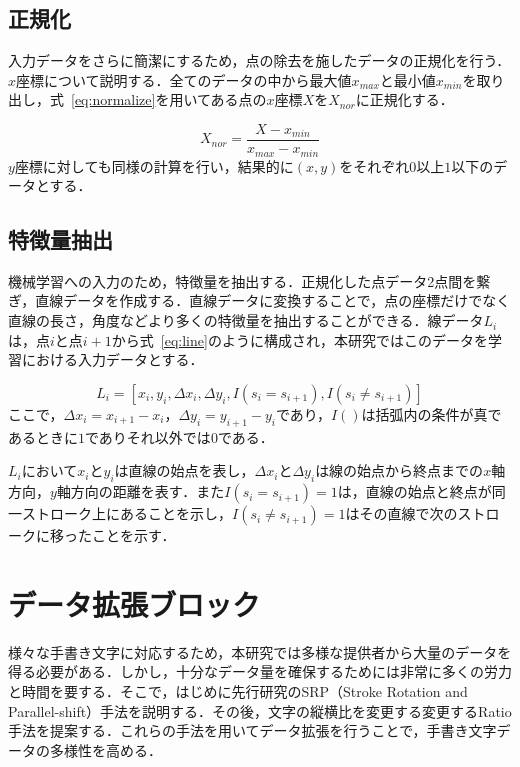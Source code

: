 \subsection{正規化}
\label{normal}
入力データをさらに簡潔にするため，点の除去を施したデータの正規化を行う．
$x$座標について説明する．全てのデータの中から最大値$x_{max}$と最小値$x_{min}$を取り出し，式~\ref{eq:normalize}を用いてある点の$x$座標$X$を$X_{nor}$に正規化する．

\begin{equation}
  X_{nor} = \frac{X - x_{min}}{x_{max}-x_{min}}
  \label{eq:normalize}
\end{equation}
$y$座標に対しても同様の計算を行い，結果的に$(x, y)$をそれぞれ$0$以上$1$以下のデータとする．

\subsection{特徴量抽出}
\label{extract}
機械学習への入力のため，特徴量を抽出する．正規化した点データ2点間を繋ぎ，直線データを作成する．直線データに変換することで，点の座標だけでなく直線の長さ，角度などより多くの特徴量を抽出することができる．線データ$L_i$は，点$i$と点$i+1$から式~\ref{eq:line}のように構成され，本研究ではこのデータを学習における入力データとする．

\begin{equation}
  L_i = [x_i, y_i, \Delta{x_i}, \Delta{y_i}, I(s_i=s_{i+1}), I(s_i \neq s_{i+1})]
  \label{eq:line}
\end{equation}
ここで，$\Delta{x_i}=x_{i+1}-x_i$，$\Delta{y_i}=y_{i+1}-y_i$であり，$I()$は括弧内の条件が真であるときに$1$でありそれ以外では$0$である．

$L_i$において$x_i$と$y_i$は直線の始点を表し，$\Delta{x_i}$と$\Delta{y_i}$は線の始点から終点までの$x$軸方向，$y$軸方向の距離を表す．また$I(s_i=s_{i+1})=1$は，直線の始点と終点が同一ストローク上にあることを示し，$I(s_i \neq s_{i+1})=1$はその直線で次のストロークに移ったことを示す．

\section{データ拡張ブロック}
\label{augment}
様々な手書き文字に対応するため，本研究では多様な提供者から大量のデータを得る必要がある．しかし，十分なデータ量を確保するためには非常に多くの労力と時間を要する．そこで，はじめに先行研究\cite{takahashi}のSRP（Stroke Rotation and Parallel-shift）手法を説明する．その後，文字の縦横比を変更する変更するRatio手法を提案する．これらの手法を用いてデータ拡張を行うことで，手書き文字データの多様性を高める．

